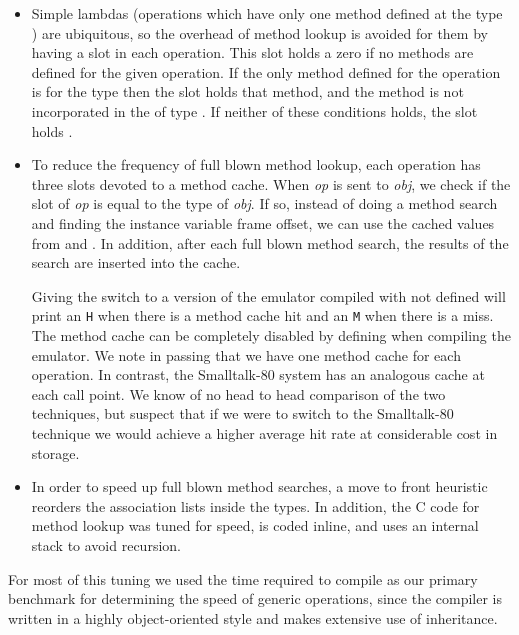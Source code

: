 \begin{itemize}

\item
Simple lambdas (operations which have only one method defined at the
type ) are ubiquitous, so the overhead of method lookup is
avoided for them by having a  slot in each operation.
This slot holds a zero if no methods are defined for the given
operation.  If the only method defined for the operation is for the
type  then the  slot holds that method, and the
method is not incorporated in the  of type
.  If neither of these conditions holds, the
 slot holds .

\item
To reduce the frequency of full blown method lookup, each operation
has three slots devoted to a method cache.  When \emph{op} is sent to
\emph{obj}, we check if the  slot of \emph{op} is equal
to the type of \emph{obj}.  If so, instead of doing a method search and
finding the instance variable frame offset, we can use the cached
values from  and .  In addition,
after each full blown method search, the results of the search are
inserted into the cache.

Giving the  switch to a version of the emulator compiled with
 not defined will print an \texttt{H} when there is a
method cache hit and an \texttt{M} when there is a miss.  The method
cache can be completely disabled by defining
 when compiling the emulator.  We
note in passing that we have one method cache for each operation.  In
contrast, the Smalltalk-80  system has an
analogous cache at each call point.  We know of no head to head
comparison of the two techniques, but suspect that if we were to
switch to the Smalltalk-80 technique we would achieve a higher average
hit rate at considerable cost in storage.

\item
In order to speed up full blown method searches, a move to front
heuristic reorders the association lists inside the types.  In
addition, the C code for method lookup was tuned for speed, is coded
inline, and uses an internal stack to avoid recursion.
\end{itemize}

For most of this tuning we used the time required to compile
 as our primary benchmark for determining the
speed of generic operations, since the compiler is written in a highly
object-oriented style and makes extensive use of inheritance.



